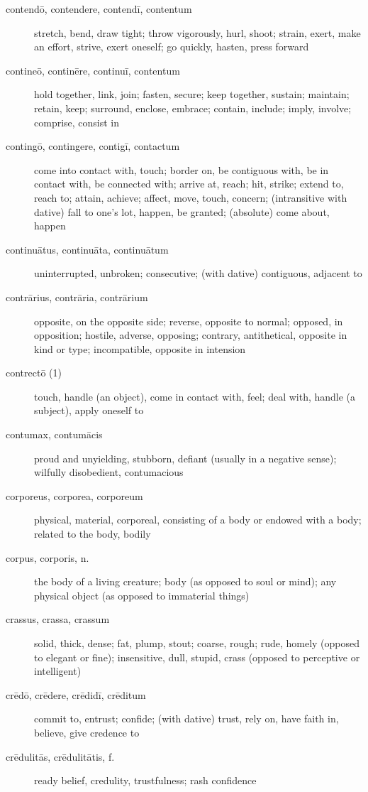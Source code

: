 \begin{description}
    \item[contendō, contendere, contendī, contentum] stretch, bend, draw tight; throw vigorously, hurl, shoot; strain, exert, make an effort, strive, exert oneself; go quickly, hasten, press forward
    \item[contineō, continēre, continuī, contentum] hold together, link, join; fasten, secure; keep together, sustain; maintain; retain, keep; surround, enclose, embrace; contain, include; imply, involve; comprise, consist in
    \item[contingō, contingere, contigī, contactum] come into contact with, touch; border on, be contiguous with, be in contact with, be connected with; arrive at, reach; hit, strike; extend to, reach to; attain, achieve; affect, move, touch, concern; (intransitive with dative) fall to one's lot, happen, be granted; (absolute) come about, happen
    \item[continuātus, continuāta, continuātum] uninterrupted, unbroken; consecutive; (with dative) contiguous, adjacent to
    \item[contrārius, contrāria, contrārium] opposite, on the opposite side; reverse, opposite to normal; opposed, in opposition; hostile, adverse, opposing; contrary, antithetical, opposite in kind or type; incompatible, opposite in intension
    \item[contrectō (1)] touch, handle (an object), come in contact with, feel; deal with, handle (a subject), apply oneself to
    \item[contumax, contumācis] proud and unyielding, stubborn, defiant (usually in a negative sense); wilfully disobedient, contumacious
    \item[corporeus, corporea, corporeum] physical, material, corporeal, consisting of a body or endowed with a body; related to the body, bodily
    \item[corpus, corporis, n.] the body of a living creature; body (as opposed to soul or mind); any physical object (as opposed to immaterial things)
    \item[crassus, crassa, crassum] solid, thick, dense; fat, plump, stout; coarse, rough; rude, homely (opposed to elegant or fine); insensitive, dull, stupid, crass (opposed to perceptive or intelligent)
    \item[crēdō, crēdere, crēdidī, crēditum] commit to, entrust; confide; (with dative) trust, rely on, have faith in, believe, give credence to
    \item[crēdulitās, crēdulitātis, f.] ready belief, credulity, trustfulness; rash confidence

\end{description}

